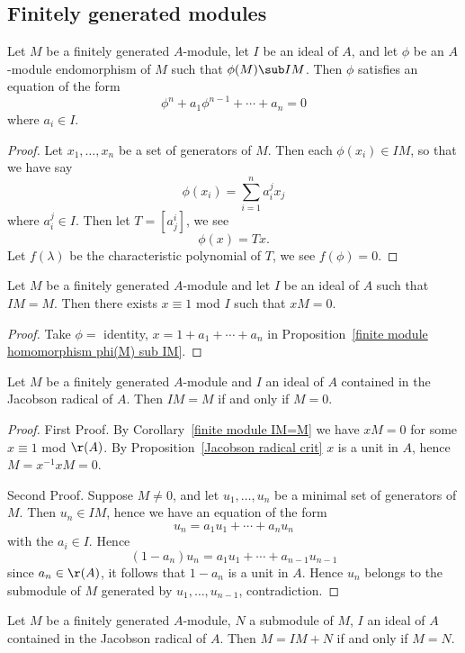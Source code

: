 \subsection{Finitely generated modules}
\begin{proposition}\label{finite module homomorphism phi(M) sub IM}
Let $M$ be a finitely generated $A$-module, let $I$ be an ideal of $A$, and let $\phi$ be an $A$-module endomorphism of $M$ such that $\phi(M)\sub IM$. Then $\phi$ satisfies an equation of the form
\[\phi^n+a_1\phi^{n-1}+\cdots+a_n=0\]
where $a_i\in I$.
\end{proposition}
\begin{proof}
Let $x_1,\dots,x_n$ be a set of generators of $M$. Then each $\phi(x_i)\in IM$, so that we have say
\[\phi(x_i)=\sum_{i=1}^na^j_ix_j\]
where $a^j_i\in I$. Then let $T=[a^i_j]$, we see
\[\phi (x)=Tx.\]
Let $f(\lambda)$ be the characteristic polynomial of $T$, we see $f(\phi)=0$.
\end{proof}
\begin{corollary}\label{finite module IM=M}
Let $M$ be a finitely generated $A$-module and let $I$ be an ideal of $A$ such that $IM=M$. Then there exists $x\equiv 1$ mod $I$ such that $xM=0$.
\end{corollary}
\begin{proof}
Take $\phi=$ identity, $x=1+a_1+\cdots+a_n$ in Proposition~\ref{finite module homomorphism phi(M) sub IM}.
\end{proof}
\begin{proposition}\label{Nakayama lemma}
Let $M$ be a finitely generated $A$-module and $I$ an ideal of $A$ contained in the Jacobson radical of $A$. Then $IM=M$ if and only if $M=0$.
\end{proposition}
\begin{proof}
First Proof. By Corollary~\ref{finite module IM=M} we have $xM=0$ for some $x\equiv 1$ mod $\r(A)$. By Proposition~\ref{Jacobson radical crit} $x$ is a unit in $A$, hence $M=x^{-1}xM=0$.\par
Second Proof. Suppose $M\neq0$, and let $u_1,\dots,u_n$ be a minimal set of generators of $M$. Then $u_n\in IM$, hence we have an equation of the form 
\[u_n=a_1u_1+\cdots+a_nu_n\]
with the $a_i\in I$. Hence
\[(1-a_n)u_n=a_1u_1+\cdots+a_{n-1}u_{n-1}\]
since $a_n\in \r(A)$, it follows that $1-a_n$ is a unit in $A$. Hence $u_n$ belongs to the submodule of $M$ generated by $u_1,\dots,u_{n-1}$, contradiction.
\end{proof}
\begin{corollary}\label{finite module M=IM+N then M=N}
Let $M$ be a finitely generated $A$-module, $N$ a submodule of $M$, $I$ an ideal of $A$ contained in the Jacobson radical of $A$. Then $M=IM+N$ if and only if $M=N$.
\end{corollary}
